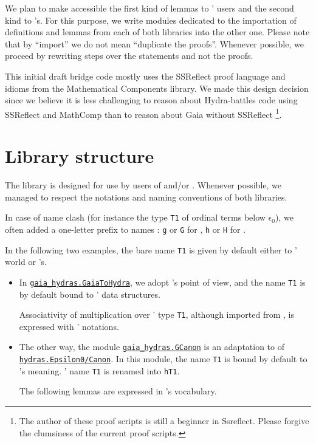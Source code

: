   We plan to make accessible the first kind of lemmas to \HydrasLib' users and the second kind to \gaia's. For this purpose, we write modules dedicated to the importation of definitions and lemmas from each of both libraries into the other one.
Please note that by ``import'' we do not mean ``duplicate the proofs''.  Whenever possible, we proceed by rewriting steps over the statements and not the proofs. 



This initial draft bridge code mostly uses the SSReflect proof language
and idioms from the Mathematical Components library. We made this design
decision since we believe it is less challenging to reason about
Hydra-battles code using SSReflect and MathComp than to reason about
Gaia without SSReflect \footnote{The author of these proof scripts is still a beginner in Ssreflect. Please forgive the clumsiness of the current proof scripts.}.



\section{Library structure}
The \gaiaHydras library is designed for use  by users of
\gaia and/or  \HydrasLib. Whenever possible, we managed to respect the notations and naming conventions of both libraries.

In case of name clash (for instance the type \texttt{T1} of ordinal terms below $\epsilon_0$), we often added a one-letter prefix to names : \texttt{g} or \texttt{G} for \gaia, \texttt{h} or \texttt{H}
for \HydrasLib.

In the following two examples, the bare name \texttt{T1} is given by default either  to \HydrasLib' world or \gaia's. 
 

  
\begin{itemize}
\item In
  \href{../theories/html/gaia_hydras.GaiaToHydra.html}%
  {\texttt{gaia\_hydras.GaiaToHydra}}, we adopt \HydrasLib's point of view, and the name \texttt{T1} is by default bound to
\HydrasLib' data structures.


Associativity of multiplication over \HydrasLib' type \texttt{T1},
although imported from \gaia, is expressed with \HydrasLib' notations.


\item The other way, the module \href{../theories/html/gaia_hydras.GCanon.html}%
  {\texttt{gaia\_hydras.GCanon}} is an adaptation to \gaia of
  \href{../theories/html/hydras.Epsilon0/Canon.html}%
  {\texttt{hydras.Epsilon0/Canon}}.
  In this module, the name \texttt{T1} is bound by default to \gaia's meaning. \HydrasLib' name \texttt{T1} is renamed into \texttt{hT1}.

  The following lemmas are expressed in \gaia's vocabulary.
  
\end{itemize}

